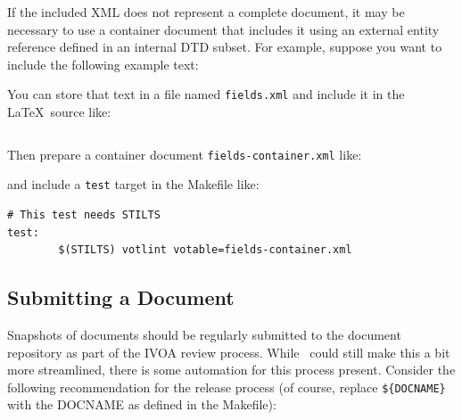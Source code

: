 \documentclass[11pt,a4paper]{ivoa}
\begin{document}
If the included XML does not represent a complete document, it may be
necessary to use a container document that includes it using an
external entity reference defined in an internal DTD subset.
For example, suppose you want to include the following example text:

You can store that text in a file named \verb|fields.xml| and
include it in the \LaTeX\ source like:
\begin{lstlisting}[basicstyle=\footnotesize]

\end{lstlisting}
Then prepare a container document \verb|fields-container.xml| like:

and include a \verb|test| target in the Makefile like:
\begin{lstlisting}[basicstyle=\footnotesize]
# This test needs STILTS
test:
        $(STILTS) votlint votable=fields-container.xml
\end{lstlisting}


\subsection{Submitting a Document}
\label{sect:submitting}

Snapshots of documents should be regularly submitted to the document
repository as part of the IVOA review process.  While \ivoatex~could
still make this a bit more streamlined, there is some automation for
this process present.  Consider the following recommendation for the
release process (of course, replace \verb|${DOCNAME}| with the DOCNAME
as defined in the Makefile):
\end{document}
